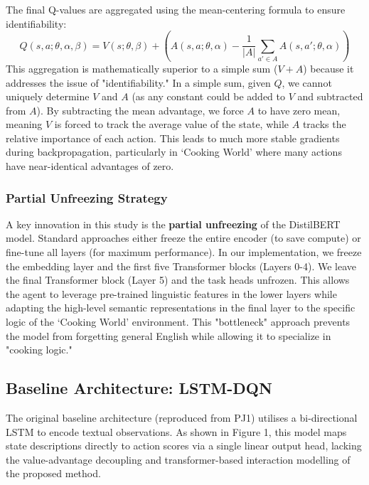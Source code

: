 \documentclass[11pt,a4paper]{article}
\begin{document}
The final Q-values are aggregated using the mean-centering formula to ensure identifiability:
\begin{equation}
Q(s, a; \theta, \alpha, \beta) = V(s; \theta, \beta) + \left( A(s, a; \theta, \alpha) - \frac{1}{|A|} \sum_{a' \in A} A(s, a'; \theta, \alpha) \right)
\end{equation}
This aggregation is mathematically superior to a simple sum ($V+A$) because it addresses the issue of "identifiability." In a simple sum, given $Q$, we cannot uniquely determine $V$ and $A$ (as any constant could be added to $V$ and subtracted from $A$). By subtracting the mean advantage, we force $A$ to have zero mean, meaning $V$ is forced to track the average value of the state, while $A$ tracks the relative importance of each action. This leads to much more stable gradients during backpropagation, particularly in `Cooking World' where many actions have near-identical advantages of zero.

\subsubsection{Partial Unfreezing Strategy}
A key innovation in this study is the \textbf{partial unfreezing} of the DistilBERT model. Standard approaches either freeze the entire encoder (to save compute) or fine-tune all layers (for maximum performance). In our implementation, we freeze the embedding layer and the first five Transformer blocks (Layers 0-4). We leave the final Transformer block (Layer 5) and the task heads unfrozen. This allows the agent to leverage pre-trained linguistic features in the lower layers while adapting the high-level semantic representations in the final layer to the specific logic of the `Cooking World' environment. This "bottleneck" approach prevents the model from forgetting general English while allowing it to specialize in "cooking logic."
\subsection{Baseline Architecture: LSTM-DQN}
The original baseline architecture (reproduced from PJ1) utilises a bi-directional LSTM to encode textual observations. As shown in Figure 1, this model maps state descriptions directly to action scores via a single linear output head, lacking the value-advantage decoupling and transformer-based interaction modelling of the proposed method.
\end{document}
